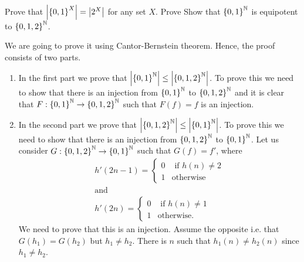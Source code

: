 \begin{chapterendexercises}
    \exercise[recommended] Prove that $\cardinality{\functions{X}{\set{0, 1}}} =
      \cardinality{2^X}$ for any set $X$.
    \exercise[recommended] Prove 
    \exercise Show that $\functions{\N}{\set{0, 1}}$ is equipotent to
      $\functions{\N}{\set{0, 1, 2}}$.
      \begin{solution}
        We are going to prove it using Cantor-Bernstein theorem.
        Hence, the proof consists of two parts.
        \begin{enumerate}
          \item In the first part we prove that
            $\cardinality{\functions{\N}{\set{0, 1}}} \le
            \cardinality{\functions{\N}{\set{0, 1, 2}}}$. To prove this we need to show that
            there is an injection from $\functions{\N}{\set{0, 1}}$ to
            $\functions{\N}{\set{0, 1, 2}}$ and it is clear that
            $F :  \functions{\N}{\set{0, 1}} \to \functions{\N}{\set{0, 1, 2}}$
            such that $F(f) = f$ is an injection.
          \item In the second part we prove that 
            $\cardinality{\functions{\N}{\set{0, 1, 2}}} \le
            \cardinality{\functions{\N}{\set{0, 1}}}$.
            To prove this we need to show that there is an
            injection from $\functions{\N}{\set{0, 1, 2}}$ to $\functions{\N}{\set{0, 1}}$.
            Let us consider
            $G : \functions{\N}{\set{0, 1, 2}} \to \functions{\N}{\set{0, 1}}$
            such that $G(f) = f'$, where
            \begin{gather*}
              h'(2n - 1) =
              \begin{cases}
                0 & \text{ if } h(n) \neq 2 \\
                1 & \text{otherwise}
              \end{cases} \\
              \text{and} \\
              h'(2n) =
              \begin{cases}
                0 & \text{ if } h(n) \neq 1 \\
                1 & \text{otherwise}.
              \end{cases}
            \end{gather*}
            We need to prove that this is an injection. Assume the opposite
            i.e. that $G(h_1) = G(h_2)$ but $h_1 \neq h_2$.
            There is $n$ such that $h_1(n) \neq h_2(n)$ since $h_1 \neq h_2$.

\end{enumerate}
\end{solution}
\end{chapterendexercises}
